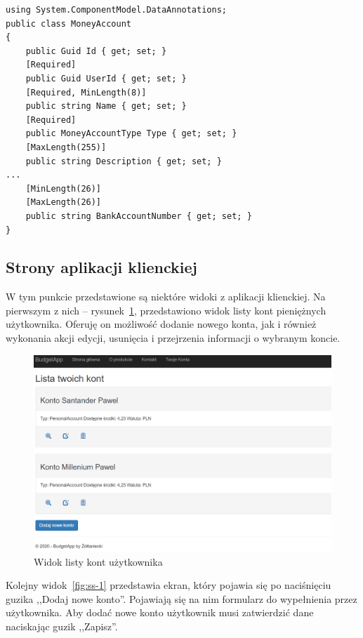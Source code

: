 {\belowcaptionskip=-10pt
\begin{lstlisting}[label=list:razor-validation-1,
    caption=Przykład klasy z adnotacjami]
using System.ComponentModel.DataAnnotations;
public class MoneyAccount
{
    public Guid Id { get; set; }
    [Required]
    public Guid UserId { get; set; }
    [Required, MinLength(8)]
    public string Name { get; set; }
    [Required]
    public MoneyAccountType Type { get; set; }
    [MaxLength(255)]
    public string Description { get; set; }
...
    [MinLength(26)]
    [MaxLength(26)]
    public string BankAccountNumber { get; set; }
}
\end{lstlisting}
}

\subsection{Strony aplikacji klienckiej}
\label{subsec:widok-client}

W tym punkcie przedstawione są niektóre widoki z aplikacji klienckiej. Na pierwszym z nich -- rysunek~\ref{fig:ss-6}, przedstawiono widok listy kont pieniężnych użytkownika. Oferuję on możliwość dodanie nowego konta, jak i również wykonania akcji edycji, usunięcia i przejrzenia informacji o wybranym koncie.

\begin{figure}[ht]
	\centering
\includegraphics[scale=.35]{rys04/lista-kont.PNG}
	\caption{Widok listy kont użytkownika}
	\label{fig:ss-6}
\end{figure}

Kolejny widok~\ref{fig:ss-1} przedstawia ekran, który pojawia się po naciśnięciu guzika ,,Dodaj nowe konto''. Pojawiają się na nim formularz do wypełnienia przez użytkownika. Aby dodać nowe konto użytkownik musi zatwierdzić dane naciskając guzik ,,Zapisz''.

